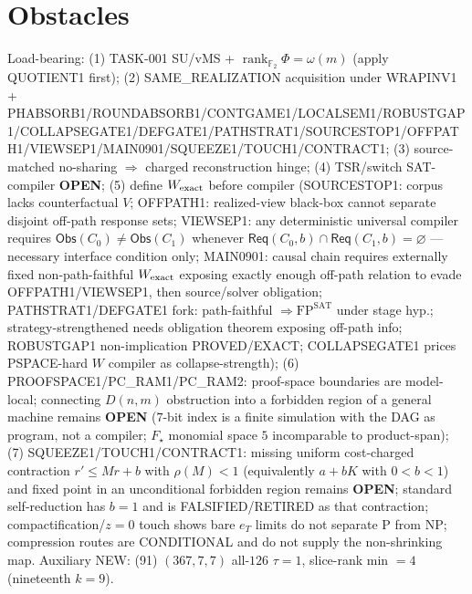 \documentclass[11pt]{article}
\begin{document}
\section*{Obstacles}
Load-bearing: (1) TASK-001 SU/vMS + $\operatorname{rank}_{\mathbb F_2}\Phi=\omega(m)$ (apply QUOTIENT1 first);
(2) SAME\_REALIZATION acquisition under WRAPINV1 + PHABSORB1/ROUNDABSORB1/CONTGAME1/LOCALSEM1/ROBUSTGAP1/COLLAPSEGATE1/DEFGATE1/PATHSTRAT1/SOURCESTOP1/OFFPATH1/VIEWSEP1/MAIN0901/SQUEEZE1/TOUCH1/CONTRACT1;
(3) source-matched no-sharing $\Rightarrow$ charged reconstruction hinge;
(4) TSR/switch SAT-compiler \textbf{OPEN};
(5) define $W_{\rm exact}$ before compiler (SOURCESTOP1: corpus lacks counterfactual $V$;
OFFPATH1: realized-view black-box cannot separate disjoint off-path response sets;
VIEWSEP1: any deterministic universal compiler requires $\mathsf{Obs}(C_0)\ne\mathsf{Obs}(C_1)$
whenever $\mathsf{Req}(C_0,b)\cap\mathsf{Req}(C_1,b)=\varnothing$ --- necessary interface condition only;
MAIN0901: causal chain requires externally fixed non-path-faithful $W_{\rm exact}$ exposing
exactly enough off-path relation to evade OFFPATH1/VIEWSEP1, then source/solver obligation;
PATHSTRAT1/DEFGATE1 fork: path-faithful $\Rightarrow\mathrm{FP}^{\mathrm{SAT}}$ under stage hyp.;
strategy-strengthened needs obligation theorem exposing off-path info;
ROBUSTGAP1 non-implication PROVED/EXACT; COLLAPSEGATE1 prices PSPACE-hard $W$ compiler as collapse-strength);
(6) PROOFSPACE1/PC\_RAM1/PC\_RAM2: proof-space boundaries are model-local; connecting $D(n,m)$ obstruction into a
forbidden region of a general machine remains \textbf{OPEN} ($7$-bit index is a finite simulation with the DAG as program, not a compiler; $F_\star$ monomial space $5$ incomparable to product-span);
(7) SQUEEZE1/TOUCH1/CONTRACT1: missing uniform cost-charged contraction $r'\le Mr+b$ with $\rho(M){<}1$ (equivalently $a+bK$ with $0{<}b{<}1$) and fixed point in an unconditional forbidden region remains \textbf{OPEN};
standard self-reduction has $b{=}1$ and is FALSIFIED/RETIRED as that contraction; compactification/$z{=}0$ touch shows bare $e_T$ limits do not separate P from NP;
compression routes are CONDITIONAL and do not supply the non-shrinking map.
Auxiliary NEW: (91) $(367,7,7)$ all-$126$ $\tau{=}1$, slice-rank min $=4$ (nineteenth $k{=}9$).
\end{document}
